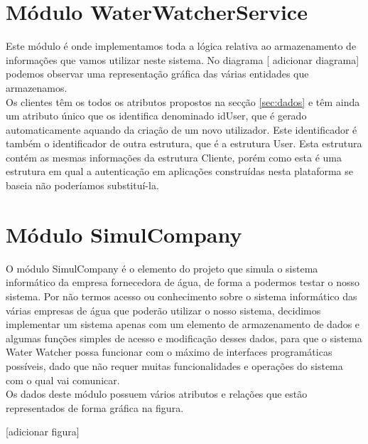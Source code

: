 \section{Módulo WaterWatcherService} \label{modwws} %
Este módulo é onde implementamos toda a lógica relativa ao armazenamento de informações que vamos utilizar neste sistema. No diagrama [ adicionar diagrama] podemos observar uma representação gráfica das várias entidades que armazenamos.\\
Os clientes têm os todos os atributos propostos na secção \ref{sec:dados} e têm ainda um atributo único que os identifica denominado idUser, que é gerado automaticamente aquando da criação de um novo utilizador. Este identificador é também o identificador de outra estrutura, que é a estrutura User. Esta estrutura contém as mesmas informações da estrutura Cliente, porém como esta é uma estrutura em qual a autenticação em aplicações construídas nesta plataforma se baseia \cite{outs:users} não poderíamos substituí-la.

\section{Módulo SimulCompany} \label{modsc} %
O módulo SimulCompany é o elemento do projeto que simula o sistema informático da empresa fornecedora de água, de forma a podermos testar o nosso sistema. Por não termos acesso ou conhecimento sobre o sistema informático das várias empresas de água que poderão utilizar o nosso sistema, decidimos implementar um sistema apenas com um elemento de armazenamento de dados e algumas funções simples de acesso e modificação desses dados, para que o sistema Water Watcher possa funcionar com o máximo de interfaces programáticas possíveis, dado que não requer muitas funcionalidades e operações do sistema com o qual vai comunicar.\\
Os dados deste módulo possuem vários atributos e relações que estão representados de forma gráfica na figura.

[adicionar figura]

